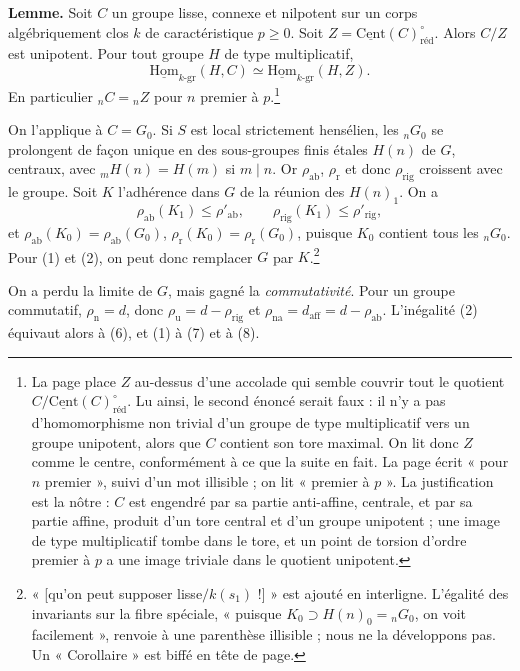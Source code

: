 \documentclass[11pt,a4paper]{article}
\begin{document}
\textbf{Lemme.} Soit $C$ un groupe lisse, connexe et nilpotent sur un corps
algébriquement clos $k$ de caractéristique $p \geqslant 0$. Soit
$Z = \underline{\mathrm{Cent}}(C)^{\circ}_{\mathrm{réd}}$. Alors $C/Z$ est
unipotent. Pour tout groupe $H$ de type multiplicatif,
\[
  \underline{\mathrm{Hom}}_{k\text{-gr}}(H, C) \simeq
  \underline{\mathrm{Hom}}_{k\text{-gr}}(H, Z) .
\]
En particulier ${}_{n}C = {}_{n}Z$ pour $n$ premier à $p$.\footnote{La page
place $Z$ au-dessus d'une accolade qui semble couvrir tout le quotient
$C/\underline{\mathrm{Cent}}(C)^{\circ}_{\mathrm{réd}}$. Lu ainsi, le second
énoncé serait faux : il n'y a pas d'homomorphisme non trivial d'un groupe de
type multiplicatif vers un groupe unipotent, alors que $C$ contient son tore
maximal. On lit donc $Z$ comme le centre, conformément à ce que la suite en
fait. La page écrit « pour $n$ premier », suivi d'un mot illisible ; on lit
« premier à $p$ ». La justification est la nôtre :
$C$ est engendré par sa partie anti-affine, centrale, et par sa partie
affine, produit d'un tore central et d'un groupe unipotent ; une image de
type multiplicatif tombe dans le tore, et un point de torsion d'ordre
premier à $p$ a une image triviale dans le quotient unipotent.}

On l'applique à $C = G_{0}$. Si $S$ est local strictement hensélien, les
${}_{n}G_{0}$ se prolongent de façon unique en des sous-groupes finis étales
$H(n)$ de $G$, centraux, avec ${}_{m}H(n) = H(m)$ si $m \mid n$. Or
$\rho_{\mathrm{ab}}$, $\rho_{\mathrm{r}}$ et donc $\rho_{\mathrm{rig}}$
croissent avec le groupe. Soit $K$ l'adhérence dans $G$ de la réunion des
$H(n)_{1}$. On a
\[
  \rho_{\mathrm{ab}}(K_{1}) \leqslant \rho'_{\mathrm{ab}}, \qquad
  \rho_{\mathrm{rig}}(K_{1}) \leqslant \rho'_{\mathrm{rig}} ,
\]
et $\rho_{\mathrm{ab}}(K_{0}) = \rho_{\mathrm{ab}}(G_{0})$,
$\rho_{\mathrm{r}}(K_{0}) = \rho_{\mathrm{r}}(G_{0})$, puisque $K_{0}$ contient
tous les ${}_{n}G_{0}$. Pour (1) et (2), on peut donc remplacer $G$ par
$K$.\footnote{« [qu'on peut supposer lisse$/k(s_{1})$ !] » est ajouté en
interligne. L'égalité des invariants sur la fibre spéciale, « puisque
$K_{0} \supset H(n)_{0} = {}_{n}G_{0}$, on voit facilement », renvoie à une
parenthèse illisible ; nous ne la développons pas. Un « Corollaire » est biffé en tête de page.}

On a perdu la limite de $G$, mais gagné la \emph{commutativité}. Pour un groupe
commutatif, $\rho_{\mathrm{n}} = d$, donc
$\rho_{\mathrm{u}} = d - \rho_{\mathrm{rig}}$ et
$\rho_{\mathrm{na}} = d_{\mathrm{aff}} = d - \rho_{\mathrm{ab}}$. L'inégalité
(2) équivaut alors à (6), et (1) à (7) et à (8).
\end{document}
